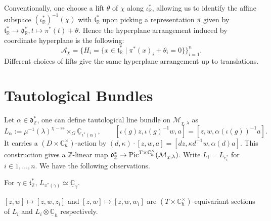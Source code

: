 \documentclass[b5paper]{article}
\newcommand{\MM}{\mathcal{M}}
\newcommand{\sstab}{\mathrm{ss}}
\newcommand{\Chbar}{\mathbb{C}^\times _\hbar}
\begin{document}
Conventionally, one choose a lift $\theta$ of $\chi$ along $\iota_\mathbb{R}^*$, allowing us to identify the affine subspace $(\iota_{\mathbb{R}}^*)^{-1}(\chi)$ with $\mathfrak{t}_\mathbb{R}^*$ upon picking a representation $\pi$ given by $\mathfrak{t}^*_\mathbb{R}\rightarrow \mathfrak{d}_\mathbb{R}^*, t\mapsto \pi^*(t)+\theta$. Hence the hyperplane arrangement induced by coordinate hyperplane is the following:
\begin{equation*}
    \mathcal{A}_\chi = \{ H_i = \{ x \in \mathfrak{t}_{\mathbb{R}}^* \mid \pi^*(x)_i + \theta_i = 0\} \}_{i=1}^n.
\end{equation*}
Different choices of lifts give the same hyperplane arrangement up to translations.

\section{Tautological Bundles}

Let $\alpha\in \mathfrak{d}^*_\mathbb{Z}$, one can define tautological line bundle on $\MM_{\chi,\lambda}$ as 
\[
    L_\alpha:=\mu^{-1}(\lambda)^{\chi-\sstab}\times_G\underline{\mathbb{C}}_{\iota^*(\alpha)},\qquad 
\left[\iota(g)z,\iota(g)^{-1}w,a\right]=\left[z,w,\alpha(\iota(g))^{-1}a\right].
\]
It carries a $(D\times \Chbar)$-action by $(d,\kappa)\cdot [z,w,a]=\left[dz,\kappa d^{-1}w,\alpha(d)a\right]$.
This construction gives a $\mathbb{Z}$-linear map $\mathfrak{d}^*_\mathbb{Z}\rightarrow \textnormal{Pic}^{T\times \Chbar}(\MM_{\chi,\lambda})$. Write $L_i=L_{e^*_i}$ for $i\in 1,\dots ,n$.
We have the following observations.
\begin{proposition}[pps:]{}
    For $\gamma\in \mathfrak{t}^*_\mathbb{Z}$, $L_{\pi^*(\gamma)}\simeq \underline{\mathbb{C}}_{\gamma}$.
\end{proposition}

\begin{proposition}[pps:]{}
    $[z,w]\mapsto [z,w,z_i]$ and $[z,w]\mapsto [z,w,w_i]$ are $(T\times \Chbar)$-equivariant sections of $L_i$ and $L_i\otimes\underline{\mathbb{C}}_{\hbar}$ respectively.
\end{proposition}
\end{document}
